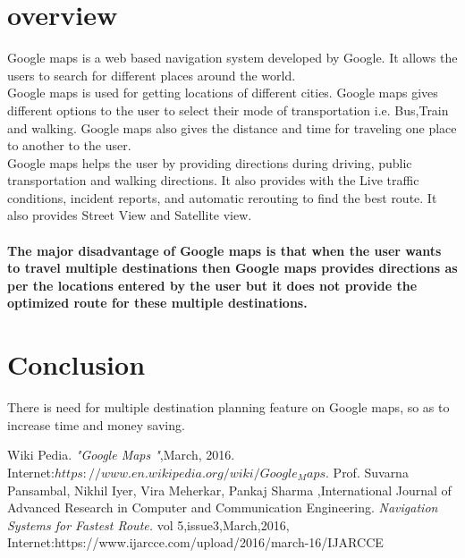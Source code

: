 \documentclass[11pt]{article}
\begin{document}
\section{overview}
Google maps is a web based navigation system developed by Google. It allows the users to search for different places around the world.\cite{Wiki2016} \\
  Google maps is used for getting locations of different cities.  Google maps gives different options to the user to select their mode of transportation i.e. Bus,Train and walking.   
 Google maps also gives the distance and time for traveling one place to another to the user. \\
 Google maps helps the user by providing directions during driving, public transportation and walking directions. It also provides with the Live traffic conditions, incident reports, and automatic rerouting to find the best route. It also provides Street View and Satellite view.\cite{Suvarna2016}  
 \paragraph{The major disadvantage of Google maps is that when the user wants to travel multiple destinations then Google maps provides directions as per the locations entered by the user but it does not provide the optimized route for these multiple destinations.\cite{Suvarna2016}}
 \section{Conclusion}
 There is need for multiple destination planning feature on Google maps, so as to increase time and money saving.
 
  \begin{thebibliography}{9}
   Wiki Pedia. \textit{"Google Maps "},March, 2016.\\
 Internet:$https://www.en.wikipedia.org/wiki/Google_Maps$.
     Prof. Suvarna Pansambal, Nikhil Iyer, Vira Meherkar, Pankaj Sharma ,International Journal of Advanced Research in Computer and Communication Engineering. \textit{Navigation Systems  for Fastest Route.} vol 5,issue3,March,2016,
    Internet:https://www.ijarcce.com/upload/2016/march-16/IJARCCE%
 



\end{thebibliography}
\end{document}
